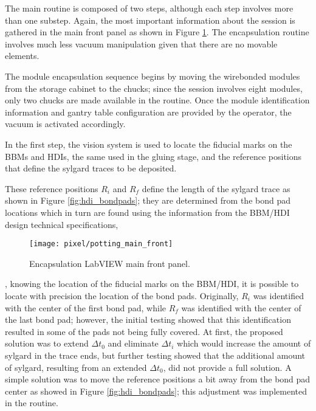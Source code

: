 The main routine is composed of two steps, although each step involves more than one substep. Again, the most important information about the session is gathered in the main front panel as shown in Figure \ref{fig:potting_main_front}. The encapsulation routine involves much less vacuum manipulation given that there are no movable elements.

The module encapsulation sequence begins by moving the wirebonded modules from the storage cabinet to the chucks; since the session involves eight modules, only two chucks are made available in the routine. Once the module identification information and gantry table configuration are provided by the operator, the vacuum is activated accordingly.

In the first step, the vision system is used to locate the fiducial marks on the BBMs and HDIs, the same used in the gluing stage, and the reference positions that define the sylgard traces to be deposited. 

These reference positions $R_i$ and $R_f$ define the length of the sylgard trace as shown in Figure \ref{fig:hdi_bondpads}; they are determined from the bond pad locations which in turn are found using the information from the BBM/HDI design technical specifications, 

\begin{landscape}
\begin{figure}[h]
\begin{center}
    \vspace{-2.0cm}
    \hspace{-1cm}
    \texttt{[image: pixel/potting\_main\_front]}
    \caption[Encapsulation LabVIEW main front panel]{Encapsulation LabVIEW main front panel.}\label{fig:potting_main_front}
    \vspace{-1cm}
    \hspace{-2cm}
\end{center}
\end{figure}
\end{landscape}

\noindent \ie, knowing the location of the fiducial marks on the BBM/HDI, it is possible to locate with precision the location of the bond pads. Originally, $R_i$ was identified with the center of the first bond pad, while $R_f$ was identified with the center of the last bond pad; however, the initial testing showed that this identification resulted in some of the pads not being fully covered. At first, the proposed solution was to extend $\Delta t_0$ and eliminate $\Delta t_i$ which would increase the amount of sylgard in the trace ends, but further testing showed that the additional amount of sylgard, resulting from an extended $\Delta t_0$, did not provide a full solution. A simple solution was to move the reference positions a bit away from the bond pad center as showed in Figure \ref{fig:hdi_bondpads}; this adjustment was implemented in the routine. 

